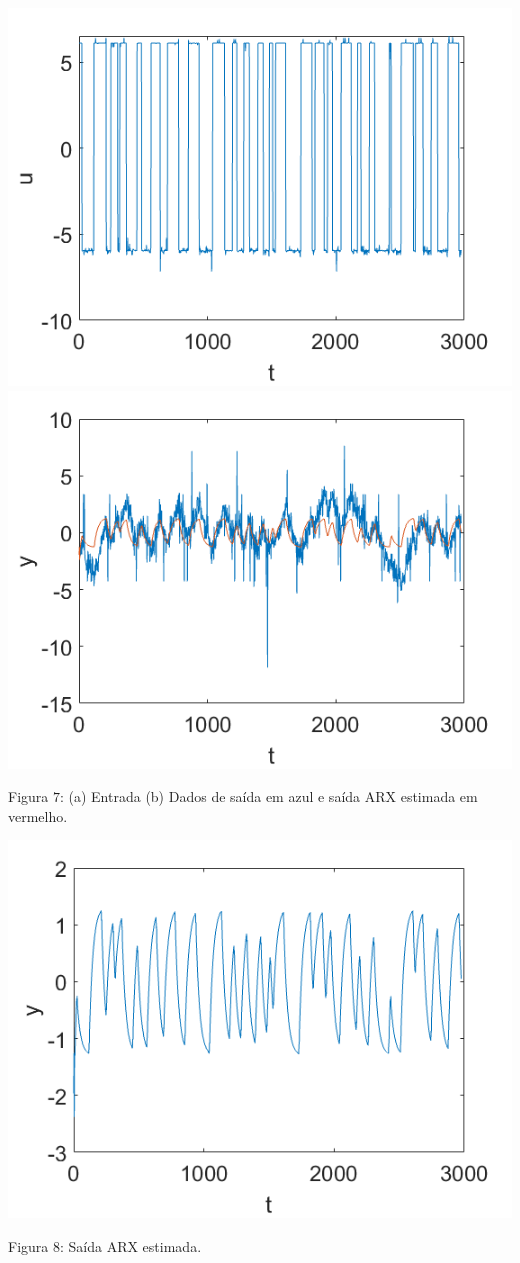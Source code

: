\documentclass{rbfin}
\begin{document}
\begin{center}
\includegraphics[scale=0.5]{2b1}
\includegraphics[scale=0.5]{2b2}

Figura $7$: (a) Entrada (b) Dados de saída em azul e saída ARX estimada em vermelho. 
\end{center}

\begin{center}
\includegraphics[scale=0.666]{2b3}

Figura $8$: Saída ARX estimada. 
\end{center}
\end{document}
